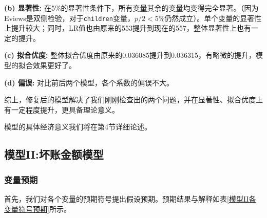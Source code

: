 \documentclass[13.5pt,hyperref,a4paper,UTF8]{ctexart}
\begin{document}
\quad \textbf{(b) 显著性: }\quad 在5\%的显著性条件下，所有变量其余的变量均变得完全显著。（因为Eviews是双侧检验，对于\texttt{children}变量，$p/2<5\%$仍然成立）。单个变量的显著性上提升较大；同时，LR值也由原来的553提升到现在的557，整体显著性上也有一定的提升。

\quad \textbf{(c) 拟合优度: }\quad 整体拟合优度由原来的0.036085提升到0.036315，有略微的提升，模型的拟合效果更好了。

\quad \textbf{(d) 偏误: }\quad 对比前后两个模型，各个系数的偏误不大。

综上，修复后的模型解决了我们刚刚检查出的两个问题，并在显著性、拟合优度上有一定程度提升，更具备理论意义。

模型的具体经济意义我们将在第4节详细论述。


\subsection{模型II:坏账金额模型}
\subsubsection{变量预期}

首先，我们对各个变量的预期符号提出假设预期。预期结果与解释如表\ref{模型II各变量符号预期}所示。
\end{document}
